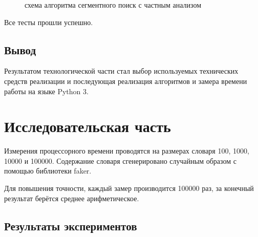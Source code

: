 \documentclass[12pt,a4paper]{report}
\begin{document}
\begin{figure}[h!]
    \caption{схема алгоритма сегментного поиск с частным анализом}
    \label{fig:image}
\end{figure}

Все тесты прошли успешно.

\section{Вывод}

Результатом технологической части стал выбор используемых технических средств реализации 
и последующая реализация алгоритмов и замера времени работы на языке Python 3.

\newpage
\chapter{Исследовательская часть}

Измерения процессорного времени проводятся на размерах словаря 100, 1000, 10000 и 100000. 
Содержание словаря сгенерировано случайным образом с помощью библиотеки faker.

Для повышения точности, каждый замер производится 100000 раз, за конечный результат берётся 
среднее арифметическое.

\section{Результаты экспериментов}
\end{document}
